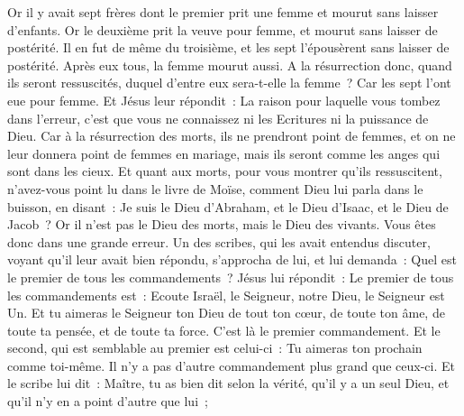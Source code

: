 \begin{multicols}{2}
Or il y avait sept frères dont le premier prit une femme et mourut sans laisser d'enfants.
Or le deuxième prit la veuve pour femme, et mourut sans laisser de postérité. Il en fut de même du troisième,
et les sept l'épousèrent sans laisser de postérité. Après eux tous, la femme mourut aussi.
A la résurrection donc, quand ils seront ressuscités, duquel d'entre eux sera-t-elle la femme~? Car les sept l'ont eue pour femme.
Et Jésus leur répondit~: La raison pour laquelle vous tombez dans l'erreur, c'est que vous ne connaissez ni les Ecritures ni la puissance de Dieu.
Car à la résurrection des morts, ils ne prendront point de femmes, et on ne leur donnera point de femmes en mariage, mais ils seront comme les anges qui sont dans les cieux.
Et quant aux morts, pour vous montrer qu'ils ressuscitent, n'avez-vous point lu dans le livre de Moïse, comment Dieu lui parla dans le buisson, en disant~: Je suis le Dieu d'Abraham, et le Dieu d'Isaac, et le Dieu de Jacob~?
Or il n'est pas le Dieu des morts, mais le Dieu des vivants. Vous êtes donc dans une grande erreur.
Un des scribes, qui les avait entendus discuter, voyant qu'il leur avait bien répondu, s'approcha de lui, et lui demanda~: Quel est le premier de tous les commandements~?
Jésus lui répondit~: Le premier de tous les commandements est~: Ecoute Israël, le Seigneur, notre Dieu, le Seigneur est Un.
Et tu aimeras le Seigneur ton Dieu de tout ton cœur, de toute ton âme, de toute ta pensée, et de toute ta force. C'est là le premier commandement.
Et le second, qui est semblable au premier est celui-ci~: Tu aimeras ton prochain comme toi-même. Il n'y a pas d'autre commandement plus grand que ceux-ci.
Et le scribe lui dit~: Maître, tu as bien dit selon la vérité, qu'il y a un seul Dieu, et qu'il n'y en a point d'autre que lui~;

\end{multicols}
